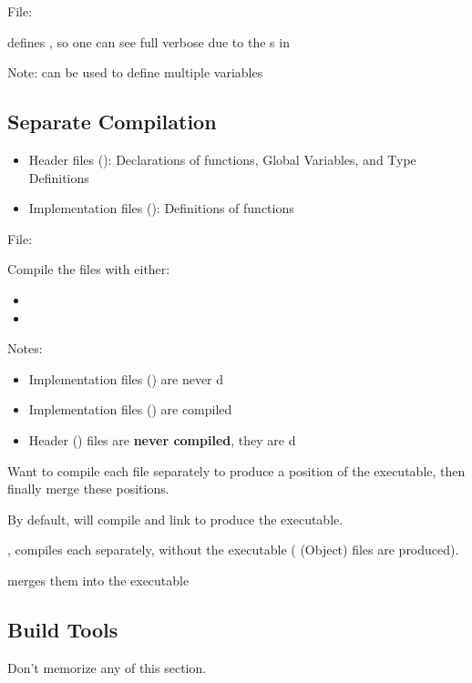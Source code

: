 File: 

 \textrightarrow{} defines , so
one can see full verbose due to the s in 

Note:  can be used to define multiple variables

\subsection{Separate Compilation}
\begin{itemize}
      \item Header files (): Declarations of functions, Global Variables,
            and Type Definitions
      \item Implementation files (): Definitions of functions
\end{itemize}


File: 

Compile the files with either:
\begin{itemize}
      \item {}
      \item {}
\end{itemize}
Notes:
\begin{itemize}
      \item Implementation files () are never d
      \item Implementation files () are compiled
      \item Header () files are \textbf{never compiled}, they are d
\end{itemize}

Want to compile each file separately to produce a position of the executable,
then finally merge these positions.

By default,  will compile and link to produce the executable.

,  \textrightarrow{} compiles each
separately, without the executable ( (Object) files are produced).

 \textrightarrow{} merges them into
the  executable

\subsection{Build Tools}
Don't memorize any of this section.


